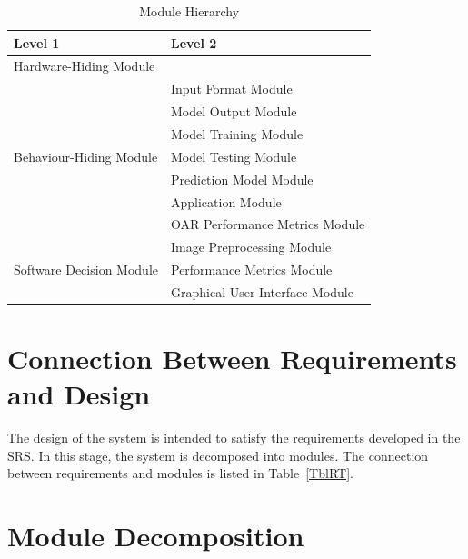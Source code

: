 \documentclass[12pt, titlepage]{article}
\begin{document}
\begin{table}[h!]
\centering
\begin{tabular}{p{} p{}}
\toprule
\textbf{Level 1} & \textbf{Level 2}\\
\midrule

{Hardware-Hiding Module} & ~ \\
\midrule

\multirow{7}{0.3\textwidth}{Behaviour-Hiding Module} &
Input Format Module\\
& Model Output Module\\
& Model Training Module\\
& Model Testing Module\\
& Prediction Model Module\\
& Application Module\\
& OAR Performance Metrics Module\\
\midrule

\multirow{3}{0.3\textwidth}{Software Decision Module} &
Image Preprocessing Module\\
& Performance Metrics Module\\
& Graphical User Interface Module\\
\bottomrule

\end{tabular}
\caption{Module Hierarchy}
\label{TblMH}
\end{table}

\section{Connection Between Requirements and Design} \label{SecConnection}

The design of the system is intended to satisfy the requirements developed in
the SRS. In this stage, the system is decomposed into modules. The connection
between requirements and modules is listed in Table~\ref{TblRT}.


\section{Module Decomposition} \label{SecMD}
\end{document}
